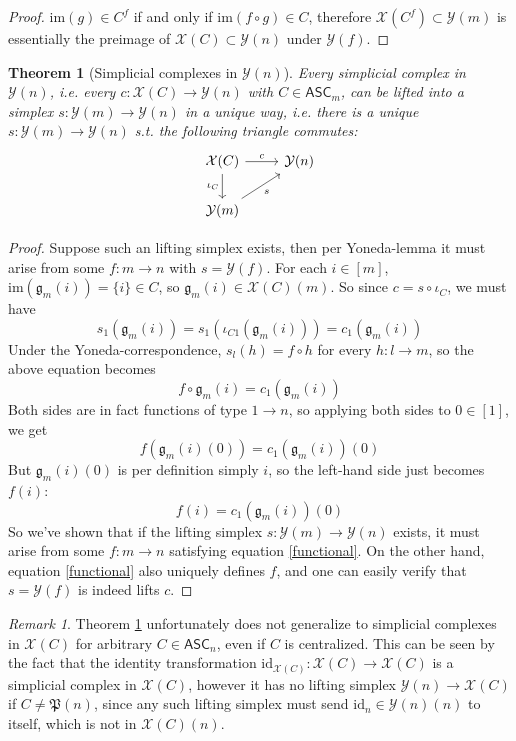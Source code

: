 \documentclass{article}
\newtheorem{theorem}{Theorem}[subsection]
\theoremstyle{remark}
\newtheorem{remark}{Remark}[subsection]
\theoremstyle{definition}
\newcommand{\p}{\mathfrak P}
\newcommand{\ASC}{\mathsf{ASC}}
\newcommand{\im}{\mathrm{im}}
\newcommand{\id}{\mathrm{id}}
\newcommand{\Y}{\mathcal Y}
\newcommand{\X}{\mathcal X}
\newcommand{\g}{\mathfrak g}
\begin{document}
	\begin{proof}
		$\im(g)\in C^f$ if and only if $\im(f\circ g)\in C$, therefore $\X(C^f)\subset\Y(m)$ is essentially the preimage of $\X(C)\subset\Y(n)$ under $\Y(f)$.
	\end{proof}
	\begin{theorem}[Simplicial complexes in $\Y(n)$]\label{lift}
		Every simplicial complex in $\Y(n)$, i.e. every $c:\X(C)\to\Y(n)$ with $C\in\ASC_m$, can be lifted into a simplex $s:\Y(m)\to\Y(n)$ in a unique way, i.e. there is a unique $s:\Y(m)\to\Y(n)$ s.t. the following triangle commutes:
		\begin{equation}\label{Lift}
			\begin{tikzcd}
				\X(C)\arrow{r}{c}\arrow{d}[swap]{\iota_C}&\Y(n)\\
				\Y(m)\arrow{ur}[swap]{s}
			\end{tikzcd}
		\end{equation}
	\end{theorem}
	\begin{proof}
		Suppose such an lifting simplex exists, then per Yoneda-lemma it must arise from some $f:m\to n$ with $s=\Y(f)$. For each $i\in[m]$, $\im(\g_m(i))=\{i\}\in C$, so $\g_m(i)\in\X(C)(m)$. So since $c=s\circ\iota_C$, we must have
		\[s_1(\g_m(i))=s_1(\iota_{C1}(\g_m(i)))=c_1(\g_m(i))\]
		Under the Yoneda-correspondence, $s_l(h)=f\circ h$ for every $h:l\to m$, so the above equation becomes
		\[f\circ\g_m(i)=c_1(\g_m(i))\]
		Both sides are in fact functions of type $1\to n$, so applying both sides to $0\in[1]$, we get
		\[f(\g_m(i)(0))=c_1(\g_m(i))(0)\]
		But $\g_m(i)(0)$ is per definition simply $i$, so the left-hand side just becomes $f(i)$:
		\begin{equation}\label{functional}
			f(i)=c_1(\g_m(i))(0)
		\end{equation}
		So we've shown that if the lifting simplex $s:\Y(m)\to\Y(n)$ exists, it must arise from some $f:m\to n$ satisfying equation \ref{functional}. On the other hand, equation \ref{functional} also uniquely defines $f$, and one can easily verify that $s=\Y(f)$ is indeed lifts $c$.
	\end{proof}
	\begin{remark}
		Theorem \ref{lift} unfortunately does not generalize to simplicial complexes in $\X(C)$ for arbitrary $C\in\ASC_n$, even if $C$ is centralized. This can be seen by the fact that the identity transformation $\id_{\X(C)}:\X(C)\to\X(C)$ is a simplicial complex in $\X(C)$, however it has no lifting simplex $\Y(n)\to\X(C)$ if $C\neq\p(n)$, since any such lifting simplex must send $\id_n\in\Y(n)(n)$ to itself, which is not in $\X(C)(n)$.
	\end{remark}
\end{document}
